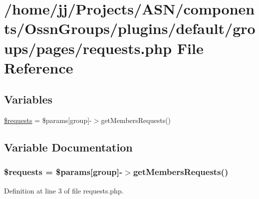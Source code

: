 \hypertarget{requests_8php}{}\section{/home/jj/\+Projects/\+A\+S\+N/components/\+Ossn\+Groups/plugins/default/groups/pages/requests.php File Reference}
\label{requests_8php}
\subsection*{Variables}
\begin{DoxyCompactItemize}
\item 
\hyperlink{requests_8php_a28d7688bd020a3b104adc19d1e08df96}{\$requests} = \$params\mbox{[}\textquotesingle{}group\textquotesingle{}\mbox{]}-\/$>$get\+Members\+Requests()
\end{DoxyCompactItemize}


\subsection{Variable Documentation}
\subsubsection[{\texorpdfstring{\$requests}{$requests}}]{\setlength{\rightskip}{0pt plus 5cm}\$requests = \$params\mbox{[}\textquotesingle{}group\textquotesingle{}\mbox{]}-\/$>$get\+Members\+Requests()}\hypertarget{requests_8php_a28d7688bd020a3b104adc19d1e08df96}{}\label{requests_8php_a28d7688bd020a3b104adc19d1e08df96}


Definition at line 3 of file requests.\+php.

